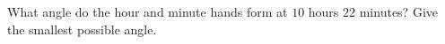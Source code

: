 What angle do the hour and minute hands form at $10$ hours $22$ minutes? Give the smallest possible angle.
